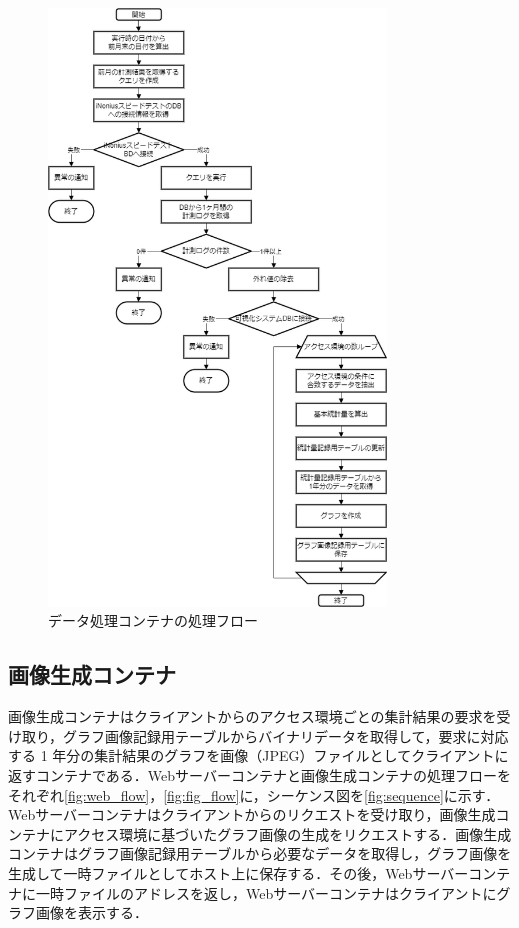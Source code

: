 \begin{figure}[htbp]
    \centering
    \includegraphics[width=0.8\textwidth]{fig/graph_flow.png}
    \caption{データ処理コンテナの処理フロー}
    \label{fig:graph_flow}
\end{figure}
\FloatBarrier

\subsection{画像生成コンテナ}
画像生成コンテナはクライアントからのアクセス環境ごとの集計結果の要求を受け取り，グラフ画像記録用テーブルからバイナリデータを取得して，要求に対応する 1 年分の集計結果のグラフを画像（JPEG）ファイルとしてクライアントに返すコンテナである．Webサーバーコンテナと画像生成コンテナの処理フローをそれぞれ\cref{fig:web_flow}，\cref{fig:fig_flow}に，シーケンス図を\cref{fig:sequence}に示す．
Webサーバーコンテナはクライアントからのリクエストを受け取り，画像生成コンテナにアクセス環境に基づいたグラフ画像の生成をリクエストする．画像生成コンテナはグラフ画像記録用テーブルから必要なデータを取得し，グラフ画像を生成して一時ファイルとしてホスト上に保存する．その後，Webサーバーコンテナに一時ファイルのアドレスを返し，Webサーバーコンテナはクライアントにグラフ画像を表示する．

